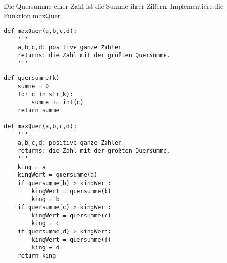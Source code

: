 \question[5] Die Quersumme einer Zahl ist die Summe ihrer Ziffern.
Implementiere die Funktion maxQuer.

\begin{lstlisting}
def maxQuer(a,b,c,d):
    '''
    a,b,c,d: positive ganze Zahlen
    returns: die Zahl mit der größten Quersumme.
    '''
\end{lstlisting}
\begin{solutionbox}{10cm}
\begin{lstlisting}
def quersumme(k):
    summe = 0
    for c in str(k):
        summe += int(c)
    return summe

def maxQuer(a,b,c,d):
    '''
    a,b,c,d: positive ganze Zahlen
    returns: die Zahl mit der größten Quersumme.
    '''
    king = a
    kingWert = quersumme(a)
    if quersumme(b) > kingWert:
        kingWert = quersumme(b)
        king = b
    if quersumme(c) > kingWert:
        kingWert = quersumme(c)
        king = c
    if quersumme(d) > kingWert:
        kingWert = quersumme(d)
        king = d
    return king
\end{lstlisting}
\end{solutionbox}
